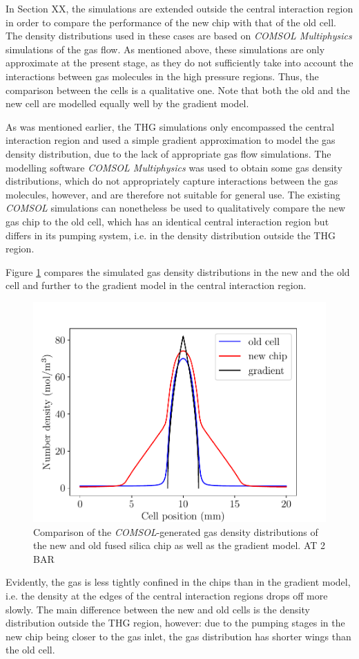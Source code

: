 \documentclass[a4paper]{jpconf}
\begin{document}
In Section XX, the simulations are extended outside the central interaction region in order to compare the performance of the new chip with that of the old cell. The density distributions used in these cases are based on \textit{COMSOL Multiphysics} simulations of the gas flow. As mentioned above, these simulations are only approximate at the present stage, as they do not sufficiently take into account the interactions between gas molecules in the high pressure regions. Thus, the comparison between the cells is a qualitative one. Note that both the old and the new cell are modelled equally well by the gradient model. \par 
As was mentioned earlier, the THG simulations only encompassed the central interaction region and used a simple gradient approximation to model the gas density distribution, due to the lack of appropriate gas flow simulations. The modelling software \textit{COMSOL Multiphysics} was used to obtain some gas density distributions, which do not appropriately capture interactions between the gas molecules, however, and are therefore not suitable for general use. The existing \textit{COMSOL} simulations can nonetheless be used to qualitatively compare the new gas chip to the old cell, which has an identical central interaction region but differs in its pumping system, i.e. in the density distribution outside the THG region. \par 
Figure \ref{im:dens} compares the simulated gas density distributions in the new and the old cell and further to the gradient model in the central interaction region. 
\begin{figure}[h]
\centering
\includegraphics[width=0.5 \textwidth]{im/old_new_comp}
\caption{Comparison of the \textit{COMSOL}-generated gas density distributions of the new and old fused silica chip as well as the gradient model. AT 2 BAR}\label{im:dens}
\end{figure}
Evidently, the gas is less tightly confined in the chips than in the gradient model, i.e. the density at the edges of the central interaction regions drops off more slowly. The main difference between the new and old cells is the density distribution outside the THG region, however: due to the pumping stages in the new chip being closer to the gas inlet, the gas distribution has shorter wings than the old cell. \par 
\end{document}
